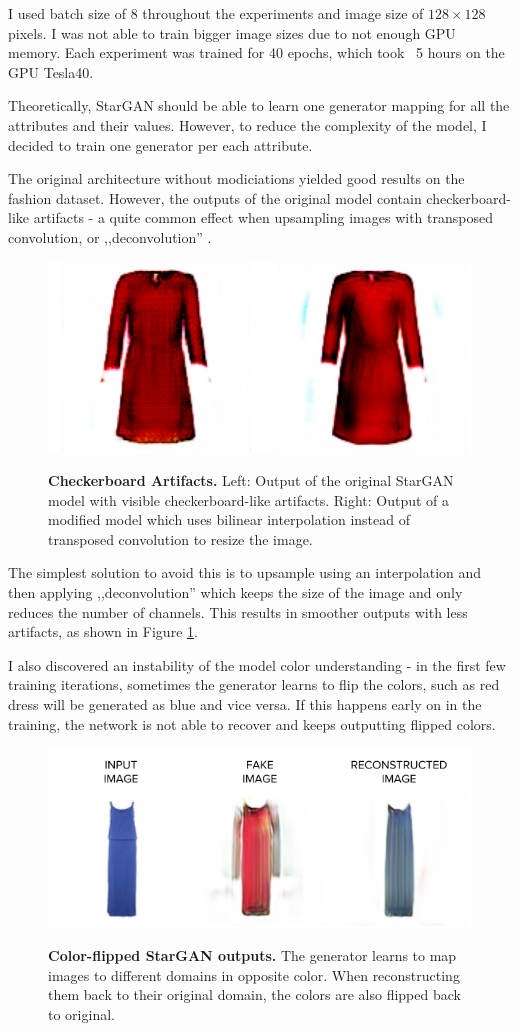 \documentclass[12pt]{report}
\begin{document}
I used batch size of 8 throughout the experiments and image size of $128 \times 128$ pixels. I was not able to train bigger image sizes due to not enough GPU memory. Each experiment was trained for 40 epochs, which took ~5 hours on the GPU Tesla40. 

Theoretically, StarGAN should be able to learn one generator mapping for all the attributes and their values. However, to reduce the complexity of the model, I decided to train one generator per each attribute.

The original architecture without modiciations yielded good results on the fashion dataset. However, the outputs of the original model contain checkerboard-like artifacts - a quite common effect when upsampling images with transposed convolution, or ,,deconvolution'' \cite{odena2016deconvolution}.

\begin{figure}[h]
\centering
{\includegraphics[width=.5\linewidth]{04_experiments/stargan/checkerboard}}
\caption{\label{fig:stargan_checkerboard} \textbf{Checkerboard Artifacts.} Left: Output of the original StarGAN model with visible checkerboard-like artifacts. Right: Output of a modified model which uses bilinear interpolation instead of transposed convolution to resize the image.}
\end{figure}
 

The simplest solution to avoid this is to upsample using an interpolation and then applying ,,deconvolution'' which keeps the size of the image and only reduces the number of channels. This results in smoother outputs with less artifacts, as shown in Figure \ref{fig:stargan_checkerboard}.

I also discovered an instability of the model color understanding - in the first few training iterations, sometimes the generator learns to flip the colors, such as red dress will be generated as blue and vice versa. If this happens early on in the training, the network is not able to recover and keeps outputting flipped colors.

\begin{figure}[h]
\centering
{\includegraphics[width=.7\linewidth]{04_experiments/stargan/color_flip}}
\caption{\label{fig:stargan_color} \textbf{Color-flipped StarGAN outputs.} The generator learns to map images to different domains in opposite color. When reconstructing them back to their original domain, the colors are also flipped back to original.}
\end{figure}
\end{document}
